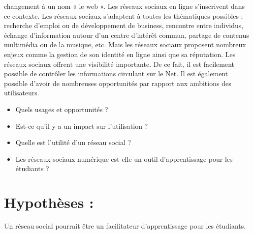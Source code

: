 \documentclass[12pt,a4paper,titlepage]{article}
\begin{document}
changement à un nom « le web ». Les réseaux sociaux en ligne s’inscrivent dans ce contexte. \newline
Les réseaux sociaux s’adaptent à toutes les thématiques possibles ; recherche d’emploi ou de
développement de business, rencontre entre individus, échange d’information autour d’un
centre d’intérêt commun, partage de contenus multimédia ou de la musique, etc. Mais les
réseaux sociaux proposent nombreux enjeux comme la gestion de son identité en ligne ainsi
que sa réputation. Les réseaux sociaux offrent une visibilité importante. De ce fait, il est
facilement possible de contrôler les informations circulant sur le Net. Il est également possible
d’avoir de nombreuses opportunités par rapport aux ambitions des utilisateurs. \newline
\begin{itemize}
    \item Quels usages et opportunités ?
    \item Est-ce qu’il y a un impact sur l’utilisation ?
    \item Quelle est l’utilité d’un réseau social ?
    \item Les réseaux sociaux numérique est-elle un outil d’apprentissage pour les étudiants ?
\end{itemize}

\section{Hypothèses :}
Un réseau social pourrait être un facilitateur d’apprentissage pour les étudiants. 
\end{document}
